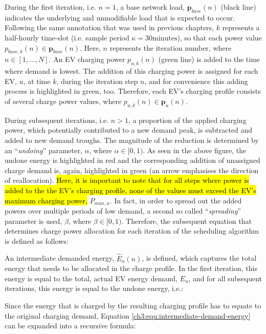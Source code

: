 

During the first iteration, i.e. $n=1$, a base network load, $\textbf{p}_{base}(n)$ (black line) indicates the underlying and unmodifiable load that is expected to occur.
Following the same annotation that was used in previous chapters, $k$ represents a half-hourly time-slot (i.e. sample period $\kappa = 30\text{minutes}$), so that each power value $p_{base,k}(n) \in \textbf{p}_{base}(n)$.
Here, $n$ represents the iteration number, where $n \in [1, \dots, N]$.
An EV charging power $p_{u,k}(n)$ (green line) is added to the time where demand is lowest.
The addition of this charging power is assigned for each EV, $u$, at time $k$, during the iteration step $n$, and for convenience this adding process is highlighted in green, too.
Therefore, each EV's charging profile consists of several charge power values, where $p_{u,k}(n) \in \textbf{p}_u(n)$.


During subsequent iterations, i.e. $n>1$, a proportion of the applied charging power, which potentially contributed to a new demand peak, is subtracted and added to new demand troughs.
The magnitude of the reduction is determined by an ``\textit{undoing}'' parameter, $\alpha$, where $\alpha \in [0, 1)$.
As seen in the above figure, the undone energy is highlighted in red and the corresponding addition of unassigned charge demand is, again, highlighted in green (an arrow emphasises the direction of reallocation).
\hl{Here, it is important to note that for all steps where power is added to the the EV's charging profile, none of the values must exceed the EV's maximum charging power, }$P_{max,u}$.
In fact, in order to spread out the added powers over multiple periods of low demand, a second so called ``\textit{spreading}'' parameter is used, $\beta$, where $\beta \in [0, 1)$.
Therefore, the subsequent equation that determines charge power allocation for each iteration of the scheduling algorithm is defined as follows:



An intermediate demanded energy, $\hat{E}_u(n)$, is defined, which captures the total energy that needs to be allocated in the charge profile.
In the first iteration, this energy is equal to the total, actual EV energy demand, $E_u$, and for all subsequent iterations, this energy is equal to the undone energy, i.e.:



Since the energy that is charged by the resulting charging profile has to equate to the original charging demand, Equation \ref{ch3:equ:intermediate-demand-energy} can be expanded into a recursive formula:


